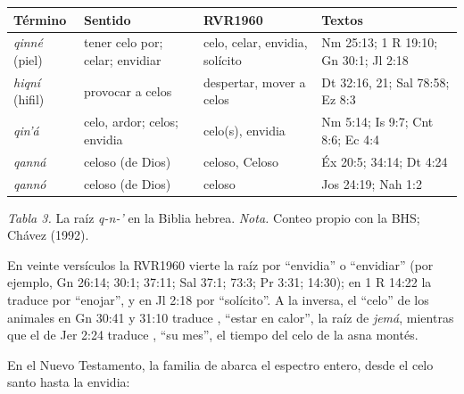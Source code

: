 \begin{center}\small\renewcommand{\arraystretch}{1.15}
\begin{tabular}{@{}L{3.2cm}L{3.6cm}L{3.0cm}L{4.0cm}@{}}
\toprule
\textbf{Término} & \textbf{Sentido} & \textbf{RVR1960} & \textbf{Textos} \\ \midrule
{} \emph{qinné} (piel) & tener celo por; celar; envidiar & celo, celar, envidia, solícito & Nm 25:13; 1 R 19:10; Gn 30:1; Jl 2:18 \\
 \emph{hiqní} (hifil) & provocar a celos & despertar, mover a celos & Dt 32:16, 21; Sal 78:58; Ez 8:3 \\
 \emph{qin'á} & celo, ardor; celos; envidia & celo(s), envidia & Nm 5:14; Is 9:7; Cnt 8:6; Ec 4:4 \\
 \emph{qanná} & celoso (de Dios) & celoso, Celoso & Éx 20:5; 34:14; Dt 4:24 \\
 \emph{qannó} & celoso (de Dios) & celoso & Jos 24:19; Nah 1:2 \\
\bottomrule
\end{tabular}\par
{\footnotesize\color{gris}\textit{Tabla 3.} La raíz \emph{q-n-'} en la Biblia hebrea. \textit{Nota.} Conteo propio con la BHS; Chávez (1992).}
\end{center}

En veinte versículos la RVR1960 vierte la raíz por ``envidia'' o ``envidiar'' (por ejemplo, Gn 26:14; 30:1; 37:11; Sal 37:1; 73:3; Pr 3:31; 14:30); en 1 R 14:22 la traduce por ``enojar'', y en Jl 2:18 por ``solícito''. A la inversa, el ``celo'' de los animales en Gn 30:41 y 31:10 traduce , ``estar en calor'', la raíz de \emph{jemá}, mientras que el de Jer 2:24 traduce , ``su mes'', el tiempo del celo de la asna montés.


En el Nuevo Testamento, la familia de  abarca el espectro entero, desde el celo santo hasta la envidia:

